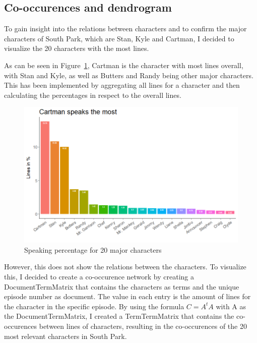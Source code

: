 \documentclass[10pt,a4paper]{article}
\begin{document}
	
	
	\subsection{Co-occurences and dendrogram}
	To gain insight into the relations between characters and to confirm the major characters of South Park, which are Stan, Kyle and Cartman, I decided to visualize the 20 characters with the most lines.
	
	As can be seen in Figure~\ref{fig:SpeakingPercentage}, Cartman is the character with most lines overall, with Stan and Kyle, as well as Butters and Randy being other major characters. This has been implemented by aggregating all lines for a character and then calculating the percentages in respect to the overall lines.
	
	\begin{figure}[h]
	\centering
	\includegraphics[scale=0.5]{images/speakingPercentage.png}
	\caption{Speaking percentage for 20 major characters}
	\label{fig:SpeakingPercentage}
	\end{figure}	
	
	
	However, this does not show the relations between the characters. To visualize this, I decided to create a co-occurence network by creating a DocumentTermMatrix that contains the characters as terms and the unique episode number as document. The value in each entry is the amount of lines for the character in the specific episode. By using the formula $C = A^tA$ with A as the DocumentTermMatrix, I created a TermTermMatrix that contains the co-occurences between lines of characters, resulting in the co-occurences of the 20 most relevant characters in South Park.
	
\end{document}
